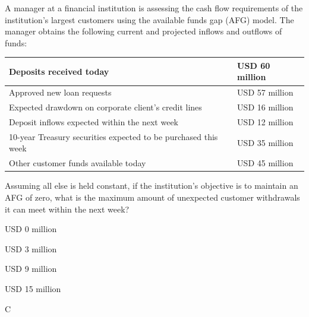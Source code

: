 \documentclass{article}
\newcounter{question} %
\begin{document}
\begin{question}
    A manager at a financial institution is assessing the cash flow requirements of the institution's largest customers using the available funds gap (AFG) model. The manager obtains the following current and projected inflows and outflows of funds:

    \begin{table}[htbp]
        \centering
        \begin{tabular}{|l|l|}
        \hline
        Deposits received today & USD 60 million \\
        \hline
        Approved new loan requests & USD 57 million \\
        \hline
        Expected drawdown on corporate client's credit lines & USD 16 million \\
        \hline
        Deposit inflows expected within the next week & USD 12 million \\
        \hline
        10-year Treasury securities expected to be purchased this week & USD 35 million \\
        \hline
        Other customer funds available today & USD 45 million \\
        \hline
        \end{tabular}
    \end{table}

    Assuming all else is held constant, if the institution's objective is to maintain an AFG of zero, what is the maximum amount of unexpected customer withdrawals it can meet within the next week?
\end{question}

\begin{choices}
    \item USD 0 million
    \item USD 3 million
    \item USD 9 million
    \item USD 15 million
\end{choices}

\begin{correctanswer}
    C
\end{correctanswer}
\end{document}
